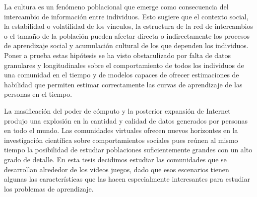 \documentclass[a4paper,10pt]{book}
\theoremstyle{definition}
\begin{document}



%
La cultura es un fen\'omeno poblacional que emerge como consecuencia del intercambio de informaci\'on entre individuos.
%
Esto sugiere que el contexto social, la estabilidad o volatilidad de los v\'inculos, la estructura de la red de intercambios o el tama\~no de la poblaci\'on pueden afectar directa o indirectamente los procesos de aprendizaje social y acumulaci\'on cultural de los que dependen los individuos.
%
Poner a prueba estas hip\'otesis se ha visto obstaculizado por falta de datos granulares y longitudinales sobre el comportamiento de todos los individuos de una comunidad en el tiempo y de modelos capaces de ofrecer estimaciones de habilidad que permiten estimar correctamente las curvas de aprendizaje de las personas en el tiempo.



La masificaci\'on del poder de c\'omputo y la posterior expansi\'on de Internet produjo una explosi\'on en la cantidad y calidad de datos generados por personas en todo el mundo.
%
Las comunidades virtuales ofrecen nuevos horizontes en la investigaci\'on cient\'ifica sobre comportamientos sociales pues reúnen al mismo tiempo la posibilidad de estudiar poblaciones suficientemente grandes con un alto grado de detalle.
%
En esta tesis decidimos estudiar las comunidades que se desarrollan alrededor de los videos juegos, dado que esos escenarios tienen algunas las caracter\'isticas que las hacen especialmente interesantes para estudiar los problemas de aprendizaje.
\end{document}
